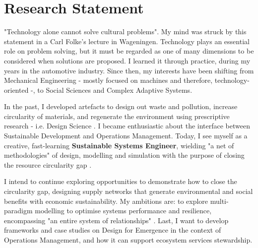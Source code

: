 \section*{Research Statement}
\vspace{-8pt}


"Technology alone cannot solve cultural problems". My mind was struck by this statement in a Carl Folke's lecture in Wageningen. Technology plays an essential role on problem solving, but it must be regarded as one of many dimensions to be considered when solutions are proposed. I learned it through practice, during my years in the automotive industry. Since then, my interests have been shifting from Mechanical Engineering - mostly focused on machines and therefore, technology-oriented -, to Social Sciences and Complex Adaptive Systems.

In the past, I developed artefacts to design out waste and pollution, increase circularity of materials, and regenerate the environment \cite{EllenMacArthurFoundation2015} using prescriptive research - i.e. Design Science \cite{VanAken2004}. I became enthusiastic about the interface between Sustainable Development and Operations Management. Today, I see myself as a creative, fast-learning \textbf{Sustainable Systems Engineer}, wielding "a net of methodologies" \cite{self1978} of design, modelling and simulation with the purpose of closing the resource circularity gap \cite{CircleEconomy2020b}. 


I intend to continue exploring opportunities to demonstrate how to close the circularity gap, designing supply networks that generate environmental and social benefits with economic sustainability. My ambitions are: to explore multi-paradigm modelling to optimise systems performance and resilience, encompassing "an entire system of relationships" \cite{self1978}. Last, I want to develop frameworks and case studies on Design for Emergence in the context of Operations Management, and how it can support ecosystem services stewardship. 